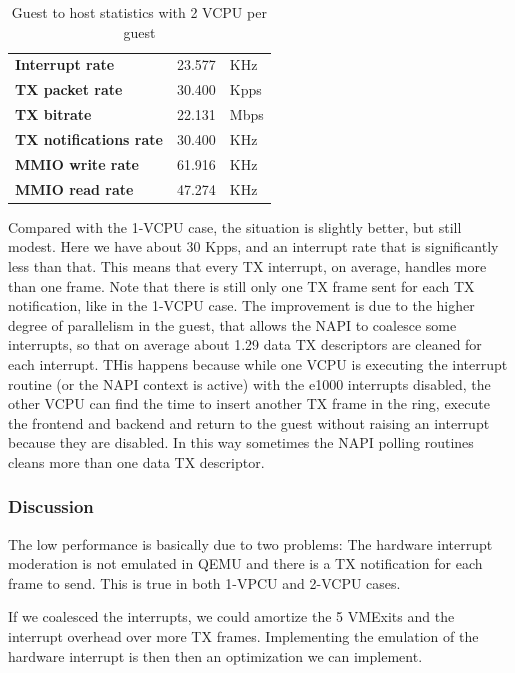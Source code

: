 \begin{table}
\begin{center}
\begin{tabular}{lrl}
\toprule
\textbf{Interrupt rate} & 23.577 & KHz\\
\textbf{TX packet rate} & 30.400 & Kpps\\
\textbf{TX bitrate} & 22.131 & Mbps\\
\textbf{TX notifications rate} & 30.400 & KHz\\
\textbf{MMIO write rate} & 61.916 & KHz\\
\textbf{MMIO read rate} & 47.274 & KHz\\
\bottomrule
\end{tabular}
\end{center}
\caption{Guest to host statistics with 2 VCPU per guest}
\label{tab:e1000-tx-g2h2vcpu}
\end{table}

Compared with the 1-VCPU case, the situation is slightly better, but still modest. Here we have about 30 Kpps, and an interrupt rate
that is significantly less than that. This means that every TX interrupt, on average, handles more than one frame.
Note that there is still only one TX frame sent for each TX notification, like in the 1-VCPU case.
The improvement is due to the higher degree of parallelism in the guest, that allows the NAPI to coalesce some interrupts, so that
on average about 1.29 data TX descriptors are cleaned for each interrupt. THis happens because while one VCPU is executing the interrupt
routine (or the NAPI context is active) with the e1000 interrupts disabled, the other VCPU can find the time to insert another TX frame
in the ring, execute the frontend and backend and return to the guest without raising an interrupt because they are disabled.
In this way sometimes the NAPI polling routines cleans more than one data TX descriptor.


\subsubsection{Discussion}
\label{sec:e1000txperfdiscuss}
The low performance is basically due to two problems: The hardware interrupt moderation is not emulated in QEMU and there is a TX 
notification for each frame to send. This is true in both 1-VPCU and 2-VCPU cases.

If we coalesced the interrupts, we could amortize the 5 VMExits and the interrupt overhead over more TX frames.
Implementing the emulation of the hardware interrupt is then then an optimization we can implement.

